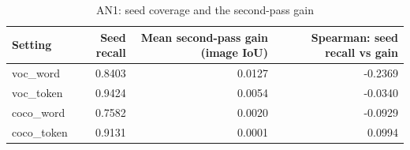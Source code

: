 \begin{table}[H]\centering\scriptsize\setlength{\tabcolsep}{3pt}
\begin{tabular}{>{\raggedright\arraybackslash}p{2.15cm}rrr}
\toprule
Setting & Seed recall & Mean second-pass gain (image IoU) & Spearman: seed recall vs gain \\
\midrule
voc\_\allowbreak{}word & 0.8403 & 0.0127 & -0.2369 \\
voc\_\allowbreak{}token & 0.9424 & 0.0054 & -0.0340 \\
coco\_\allowbreak{}word & 0.7582 & 0.0020 & -0.0929 \\
coco\_\allowbreak{}token & 0.9131 & 0.0001 & 0.0994 \\
\bottomrule
\end{tabular}
\caption{AN1: seed coverage and the second-pass gain}\label{tab:an1_coverage}
\end{table}
